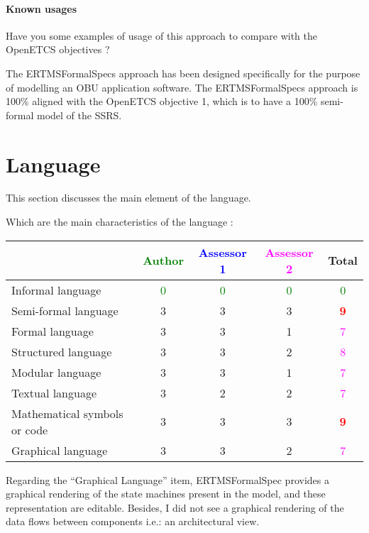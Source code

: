 \paragraph{Known usages} Have you some examples of usage of this approach to compare with the OpenETCS objectives ?

\begin{author_comment}
The ERTMSFormalSpecs approach has been designed specifically for the purpose of modelling an OBU application software. The ERTMSFormalSpecs approach is 100\% aligned with the OpenETCS objective 1, which is to have a 100\% semi-formal model of the SSRS. 
\end{author_comment}

\section{Language}
This section discusses the main element of the language.

Which are the main characteristics of the language :

\begin{tabular}{|l | c | c | c | c|}
\hline
& \textcolor{green}{Author} & \textcolor{blue}{Assessor 1} & \textcolor{magenta}{Assessor 2} & Total \\
\hline 
Informal language & \textcolor{green}{0} & \textcolor{green}{0} & \textcolor{green}{0} & \textcolor{green}{0} \\
\hline 
Semi-formal language & 3    & 3    & 3    & \textcolor{red}{\textbf{9}} \\
\hline
Formal language & 3    & 3    & 1    & \textcolor{magenta}{7} \\
\hline
Structured language & 3    & 3    & 2    & \textcolor{magenta}{8} \\
\hline 
Modular language & 3    & 3    & 1    & \textcolor{magenta}{7} \\
\hline
Textual language & 3    & 2    & 2    & \textcolor{magenta}{7} \\
\hline
Mathematical symbols or code & 3    & 3    & 3    & \textcolor{red}{\textbf{9}} \\
\hline
Graphical language & 3    & 3    & 2    & \textcolor{magenta}{7} \\
\hline
\end{tabular}

\begin{assessor1}
Regarding the "`Graphical Language"' item, ERTMSFormalSpec provides a graphical rendering of the state machines present in the model, and these representation are editable. Besides, I did not see a graphical rendering of the data flows between components i.e.: an architectural view. 
\end{assessor1}


